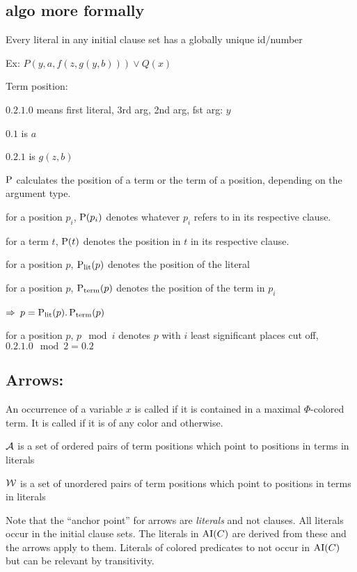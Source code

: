 \documentclass[,%
	paper=a4,%
	DIV10, %
	twoside=false,%
	liststotoc,
	bibtotoc,
	draft=false,%
	numbers=noendperiod
]{scrartcl}
\begin{document}
\clearpage
\subsection{algo more formally}

Every literal in any initial clause set has a globally unique id/number

Ex: $P(y, a, f(z, g(y, b)) ) \lor Q(x)$

Term position:

$0.2.1.0$ means first literal, 3rd arg, 2nd arg, fst arg: $y$

$0.1$ is $a$

$0.2.1$ is $g(z, b)$

$\operatorname{{\operatorname P}}$ calculates the position of a term or the term of a position, depending on the argument type.

for a position $p_i$, $\operatorname{{\operatorname P}}(p_i)$ denotes whatever $p_i$ refers to in its respective clause.

for a term $t$, $\operatorname{{\operatorname P}}(t)$ denotes the position in $t$ in its respective clause.

for a position $p$, $\operatorname{\operatorname{{\operatorname P}}_\mathrm{lit}}(p)$ denotes the position of the literal

for a position $p$, $\operatorname{\operatorname{{\operatorname P}}_\mathrm{term}}(p)$ denotes the position of the term in $p_i$ 

$\Rightarrow$ $p = \operatorname{\operatorname{{\operatorname P}}_\mathrm{lit}}(p).\operatorname{\operatorname{{\operatorname P}}_\mathrm{term}}(p)$

for a position $p$, $p \mod i$ denotes $p$ with $i$ least significant places cut off, $0.2.1.0 \mod 2 = 0.2$

\subsection{Arrows:}

\begin{defi}
	An occurrence of a variable $x$ is called  if it is contained in a maximal $\Phi$-colored term. It is called  if it is of any color and  otherwise.
\end{defi}

$\operatorname{\mathcal{A}}$ is a set of ordered pairs of term positions which point to positions in terms in literals

$\operatorname{\mathcal{W}}$ is a set of unordered pairs of term positions which point to positions in terms in literals

Note that the ``anchor point'' for arrows are \emph{literals} and not clauses.
All literals occur in the initial clause sets.
The literals in $\operatorname{AI}(C)$ are derived from these and the arrows apply to them.
Literals of colored predicates to not occur in $\operatorname{AI}(C)$ but can be relevant by transitivity.
\end{document}
